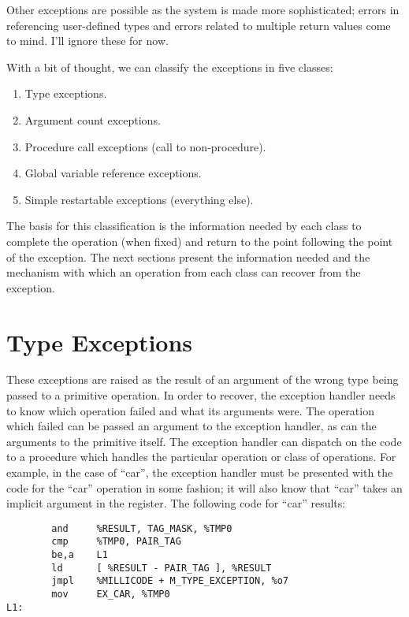 Other exceptions are possible as the system is made more sophisticated;
errors in referencing user-defined types and errors related to multiple
return values come to mind. I'll ignore these for now.

With a bit of thought, we can classify the exceptions in five classes:

\begin{enumerate}
\item Type exceptions.
\item Argument count exceptions.
\item Procedure call exceptions (call to non-procedure).
\item Global variable reference exceptions.
\item Simple restartable exceptions (everything else).
\end{enumerate}

The basis for this classification is the information needed by each class to
complete the operation (when fixed) and return to the point following the 
point of the exception. The next sections present the information needed
and the mechanism with which an operation from each class can recover from the
exception.

\section{Type Exceptions}

These exceptions are raised as the result of an argument of the wrong
type being passed to a primitive operation. In order to recover, the
exception handler needs to know which operation failed and what its
arguments were.  The operation which failed can be passed an argument
to the exception handler, as can the arguments to the primitive
itself. The exception handler can dispatch on the code to a procedure
which handles the particular operation or class of operations. For
example, in the case of ``car'', the exception handler must be
presented with the code for the ``car'' operation in some fashion; it
will also know that ``car'' takes an implicit argument in the
 register. The following code for ``car'' results:

\begin{minipage}{\linewidth}
\begin{verbatim}
        and     %RESULT, TAG_MASK, %TMP0
        cmp     %TMP0, PAIR_TAG
        be,a    L1
        ld      [ %RESULT - PAIR_TAG ], %RESULT
        jmpl    %MILLICODE + M_TYPE_EXCEPTION, %o7
        mov     EX_CAR, %TMP0
L1:
\end{verbatim}
\end{minipage}

